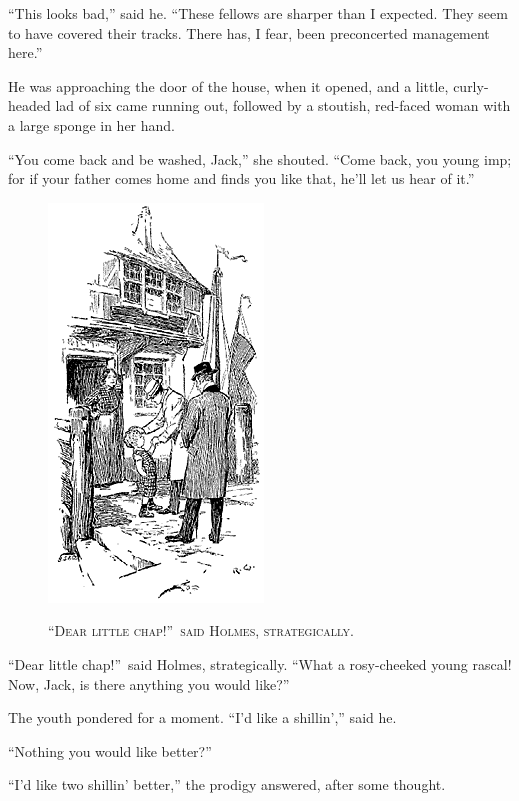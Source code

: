\documentclass[12pt,english,oneside]{book}
\newcommand{\noun}[1]{\textsc{#1}}
\begin{document}
{}``This looks bad,'' said he. {}``These fellows are sharper than
I expected. They seem to have covered their tracks. There has, I fear,
been preconcerted management here.''

He was approaching the door of the house, when it opened, and a little,
curly-headed lad of six came running out, followed by a stoutish,
red-faced woman with a large sponge in her hand.

{}``You come back and be washed, Jack,'' she shouted. {}``Come
back, you young imp; for if your father comes home and finds you like
that, he'll let us hear of it.''

%
\begin{figure}[htbp]
\noindent \begin{center}\includegraphics{images/sign410-sign-12.png}\end{center}

\noindent \begin{center}\noun{{}``Dear little chap!''\ said Holmes,
strategically.}\end{center}
\end{figure}
{}``Dear little chap!''\ said Holmes, strategically. {}``What
a rosy-cheeked young rascal! Now, Jack, is there anything you would
like?''

The youth pondered for a moment. {}``I'd like a shillin','' said
he.

{}``Nothing you would like better?''

{}``I'd like two shillin' better,'' the prodigy answered, after
some thought.
\end{document}
